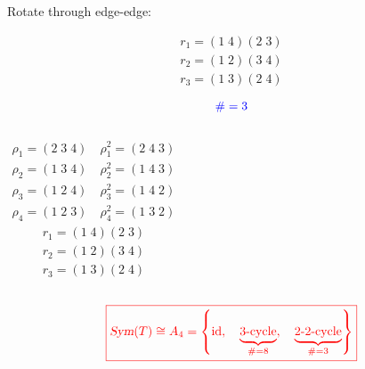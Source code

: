 \begin{frame}
  \begin{center}
	Rotate through edge-edge:
  \end{center}

  \begin{align*}
	r_1 = (1\; 4) (2\; 3) \\[6pt]
	r_2 = (1\; 2) (3\; 4) \\[6pt]
	r_3 = (1\; 3) (2\; 4)
  \end{align*}

  \pause
  \[
	\textcolor{blue}{\# = 3}
  \]
\end{frame}

\begin{frame}
  \begin{columns}
	  \begin{align*}
		\rho_{1} = (2\; 3\; 4)\quad \rho_{1}^{2} = (2\; 4\; 3) \\[3pt]
		\rho_{2} = (1\; 3\; 4)\quad \rho_{2}^{2} = (1\; 4\; 3) \\[3pt]
		\rho_{3} = (1\; 2\; 4)\quad \rho_{3}^{2} = (1\; 4\; 2) \\[3pt]
		\rho_{4} = (1\; 2\; 3)\quad \rho_{4}^{2} = (1\; 3\; 2)
	  \end{align*}
	  \begin{align*}
		r_1 = (1\; 4) (2\; 3) \\[6pt]
		r_2 = (1\; 2) (3\; 4) \\[6pt]
		r_3 = (1\; 3) (2\; 4)
	  \end{align*}
  \end{columns}

  \vspace{0.60cm}
  \[
	\textcolor{red}{\boxed{\textsl{Sym}(T) \cong A_4 = \left\{\text{id},\quad \underbrace{\text{3-cycle}}_{\# = 8},\quad \underbrace{\text{2-2-cycle}}_{\# = 3}\right\}}}
  \]
\end{frame}

